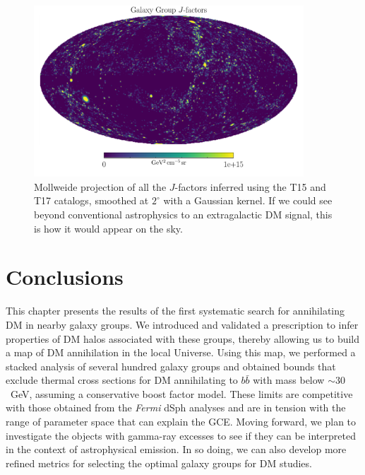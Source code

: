 \begin{figure}[htbp]
 \centering
  \includegraphics[width=0.9\textwidth]{ch-clusters/plots/jfactors.pdf}
 \caption{Mollweide projection of all the $J$-factors inferred using the T15 and T17 catalogs, smoothed at $2^\circ$ with a Gaussian kernel. If we could see beyond conventional astrophysics to an extragalactic DM signal, this is how it would appear on the sky.}
  \label{fig:jfactor_maps}
\end{figure} 

\section{Conclusions}

This chapter presents the results of the first systematic search for annihilating DM in nearby galaxy groups.  We introduced and validated  a prescription to infer properties of DM halos associated with  these groups, thereby allowing us to build a map of DM annihilation in the local Universe.  Using this map, we performed a stacked analysis of several hundred galaxy groups and obtained bounds that exclude thermal cross sections for DM  annihilating to $b \bar b$ with mass below $\sim$$30$~GeV, assuming a conservative boost factor model.  These limits are competitive with those obtained from the \emph{Fermi} dSph analyses and are in tension with the range of parameter space that can explain the GCE.  Moving forward, we plan to investigate the objects with gamma-ray excesses to see if they can be interpreted in the context of astrophysical emission.  In so doing, we can also develop more refined metrics for selecting the optimal galaxy groups for DM studies.   

